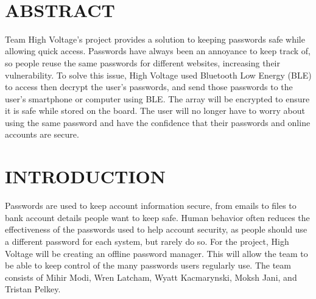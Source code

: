 \documentclass[12pt]{article}
\begin{document}
\begin{titlepage}
\begin{minipage}{0.8\textwidth}
\begin{flushleft}
		\end{flushleft}
	\end{minipage}\\[2 cm]
	
	\vfill
	
\end{titlepage}

\tableofcontents
\pagebreak

    

\section{ABSTRACT}

\hspace{1cm}Team High Voltage's project provides a solution to keeping passwords safe while allowing quick access. Passwords have always been an annoyance to keep track of, so people reuse the same passwords for different websites, increasing their vulnerability. To solve this issue, High Voltage used Bluetooth Low Energy (BLE) to access then decrypt the user's passwords, and send those passwords to the user's smartphone or computer using BLE. The array will be encrypted to ensure it is safe while stored on the board. The user will no longer have to worry about using the same password and have the confidence that their passwords and online accounts are secure.

\section{INTRODUCTION}
\hspace{1cm}Passwords are used to keep account information secure, from emails to files to bank account details people want to keep safe. Human behavior often reduces the effectiveness of the passwords used to help account security, as people should use a different password for each system, but rarely do so. For the project, High Voltage will be creating an offline password manager. This will allow the team to be able to keep control of the many passwords users regularly use. The team consists of Mihir Modi, Wren Latcham, Wyatt Kacmarynski, Moksh Jani, and Tristan Pelkey.
\end{document}
